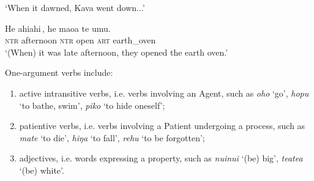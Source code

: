\glt 
‘When it dawned, Kava went down...’ \textstyleExampleref{[R229.198]} 
\z

\ea\label{ex:3.83}
\gll {\ob}He ahiahi\,{\cb}, he ma{\ꞌ}oa te {\ꞌ}umu. \\
{\db}\textsc{ntr} afternoon \textsc{ntr} open \textsc{art} earth\_oven \\

\glt 
‘(When) it was late afternoon, they opened the earth oven.’ \textstyleExampleref{[Mtx-7-15.030]}
\z

One-argument verbs include:

\begin{enumerate}
\item 
active intransitive verbs, i.e. verbs involving an Agent, such as \textit{oho} ‘go’, \textit{hopu} ‘to bathe, swim’, \textit{piko} ‘to hide oneself’;

\item 
patientive verbs, i.e. verbs involving a Patient undergoing a process, such as \textit{mate} ‘to die’, \textit{hiŋa} ‘to fall’, \textit{rehu} ‘to be forgotten’;

\item 
adjectives, i.e. words expressing a property, such as \textit{nuinui} ‘(be) big’, \textit{teatea} ‘(be) white’.

\end{enumerate}

